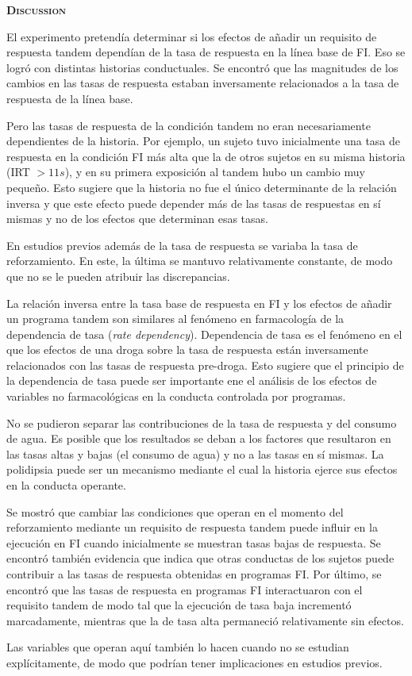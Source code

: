 \documentclass[a4paper,12pt]{article}
\begin{document}
{\scshape\bfseries Discussion}

El experimento pretendía determinar si los efectos de añadir un requisito de respuesta tandem dependían de la tasa de respuesta en la línea base de FI. Eso se logró con distintas historias conductuales. Se encontró que las magnitudes de los cambios en las tasas de respuesta estaban inversamente relacionados a la tasa de respuesta de la línea base.

Pero las tasas de respuesta de la condición tandem no eran necesariamente dependientes de la historia. Por ejemplo, un sujeto tuvo inicialmente una tasa de respuesta en la condición FI más alta que la de otros sujetos en su misma historia (IRT $> 11s$), y en su primera exposición al tandem hubo un cambio muy pequeño. Esto sugiere que la historia no fue el único determinante de la relación inversa y que este efecto puede depender más de las tasas de respuestas en sí mismas y no de los efectos que determinan esas tasas.

En estudios previos además de la tasa de respuesta se variaba la tasa de reforzamiento. En este, la última se mantuvo relativamente constante, de modo que no se le pueden atribuir las discrepancias. 

La relación inversa entre la tasa base de respuesta en FI y los efectos de añadir un programa tandem son similares al fenómeno en farmacología de la dependencia de tasa ({\itshape rate dependency}). Dependencia de tasa es el fenómeno en el que los efectos de una droga sobre la tasa de respuesta están inversamente relacionados con las tasas de respuesta pre-droga. Esto sugiere que el principio de la dependencia de tasa puede ser importante ene el análisis de los efectos de variables no farmacológicas en la conducta controlada por programas.

No se pudieron separar las contribuciones de la tasa de respuesta y del consumo de agua. Es posible que los resultados se deban a los factores que resultaron en las tasas altas y bajas (el consumo de agua) y no a las tasas en sí mismas. La polidipsia puede ser un mecanismo mediante el cual la historia ejerce sus efectos en la conducta operante.

Se mostró que cambiar las condiciones que operan en el momento del reforzamiento mediante un requisito de respuesta tandem puede influir en la ejecución en FI cuando inicialmente se muestran tasas bajas de respuesta. Se encontró también evidencia que indica que otras conductas de los sujetos puede contribuir a las tasas de respuesta obtenidas en programas FI. Por último, se encontró que las tasas de respuesta en programas FI interactuaron con el requisito tandem de modo tal que la ejecución de tasa baja incrementó marcadamente, mientras que la de tasa alta permaneció relativamente sin efectos.

Las variables que operan aquí también lo hacen cuando no se estudian explícitamente, de modo que podrían tener implicaciones en estudios previos.
\end{document}
